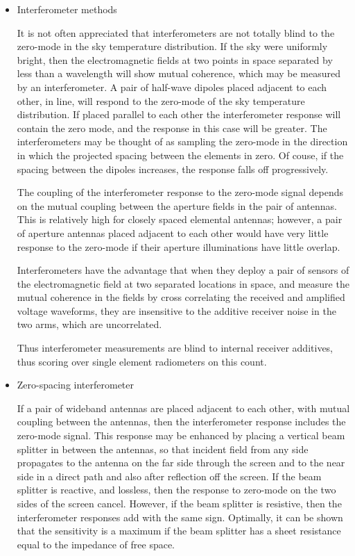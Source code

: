 \begin{itemize}
  \item
  Interferometer methods
  
  It is not often appreciated that interferometers are not totally blind to the zero-mode in the sky temperature distribution.  If the sky were uniformly bright, then the electromagnetic fields at two points in space separated by less than a wavelength will show mutual coherence, which may be measured by an interferometer.  A pair of half-wave dipoles placed adjacent to each other, in line, will respond to the zero-mode of the sky temperature distribution.  If placed parallel to each other the interferometer response will contain the zero mode, and the response in this case will be greater.  The interferometers may be thought of as sampling the zero-mode in the direction in which the projected spacing between the elements in zero.  Of couse, if the spacing between the dipoles increases, the response falls off progressively.
  
  The coupling of the interferometer response to the zero-mode signal depends on the mutual coupling between the aperture fields in the pair of antennas.  This is relatively high for closely spaced elemental antennas; however, a pair of aperture antennas placed adjacent to each other would have very little response to the zero-mode if their aperture illuminations have little overlap.
  
  Interferometers have the advantage that when they deploy a pair of sensors of the electromagnetic field at two separated locations in space, and measure the mutual coherence in the fields by cross correlating the received and amplified voltage waveforms, they are insensitive to the additive receiver noise in the two arms, which are uncorrelated.  
  
  Thus interferometer measurements are blind to internal receiver additives, thus scoring over single element radiometers on this count.
  
  \item
  Zero-spacing interferometer
  
  If a pair of wideband antennas are placed adjacent to each other, with mutual coupling between the antennas, then the interferometer response includes the zero-mode signal.  This response may be enhanced by placing a vertical beam splitter in between the antennas, so that incident field from any side propagates to the antenna on the far side through the screen and to the near side in a direct path and also after reflection off the screen.  If the beam splitter is reactive, and lossless, then the response to zero-mode on the two sides of the screen cancel.  However, if the beam splitter is resistive, then the interferometer responses add with the same sign.  Optimally, it can be shown that the sensitivity is a maximum if the beam splitter has a sheet resistance equal to the impedance of free space.  
  

\end{itemize}
